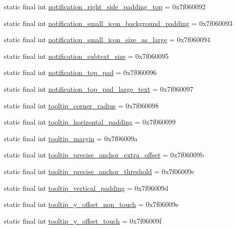 \begin{DoxyCompactItemize}
static final int \mbox{\hyperlink{classcom_1_1synnapps_1_1carouselview_1_1_r_1_1dimen_ad4e5934ef11224cd220e506921fb4fc2}{notification\+\_\+right\+\_\+side\+\_\+padding\+\_\+top}} = 0x7f060092
\item 
static final int \mbox{\hyperlink{classcom_1_1synnapps_1_1carouselview_1_1_r_1_1dimen_a8632048b827e9d3fb9257d745fc3974b}{notification\+\_\+small\+\_\+icon\+\_\+background\+\_\+padding}} = 0x7f060093
\item 
static final int \mbox{\hyperlink{classcom_1_1synnapps_1_1carouselview_1_1_r_1_1dimen_a2e67eae952d9f4b39406bed555451d94}{notification\+\_\+small\+\_\+icon\+\_\+size\+\_\+as\+\_\+large}} = 0x7f060094
\item 
static final int \mbox{\hyperlink{classcom_1_1synnapps_1_1carouselview_1_1_r_1_1dimen_a287e577ede3f2c380edc4d4b229c74f1}{notification\+\_\+subtext\+\_\+size}} = 0x7f060095
\item 
static final int \mbox{\hyperlink{classcom_1_1synnapps_1_1carouselview_1_1_r_1_1dimen_aec2a901140eddb446a6317c4f605ccec}{notification\+\_\+top\+\_\+pad}} = 0x7f060096
\item 
static final int \mbox{\hyperlink{classcom_1_1synnapps_1_1carouselview_1_1_r_1_1dimen_a1d087aa59785fee59003d5e2a9543f2a}{notification\+\_\+top\+\_\+pad\+\_\+large\+\_\+text}} = 0x7f060097
\item 
static final int \mbox{\hyperlink{classcom_1_1synnapps_1_1carouselview_1_1_r_1_1dimen_a411301c1011dea761c0ea5f831ecb09e}{tooltip\+\_\+corner\+\_\+radius}} = 0x7f060098
\item 
static final int \mbox{\hyperlink{classcom_1_1synnapps_1_1carouselview_1_1_r_1_1dimen_a42f1a58d5cb26c69309e9ab403347295}{tooltip\+\_\+horizontal\+\_\+padding}} = 0x7f060099
\item 
static final int \mbox{\hyperlink{classcom_1_1synnapps_1_1carouselview_1_1_r_1_1dimen_a8e39f4e16c1a9f73b236eb6be5cc4dfb}{tooltip\+\_\+margin}} = 0x7f06009a
\item 
static final int \mbox{\hyperlink{classcom_1_1synnapps_1_1carouselview_1_1_r_1_1dimen_a8548003c1cce40807fb06236c57d2cf6}{tooltip\+\_\+precise\+\_\+anchor\+\_\+extra\+\_\+offset}} = 0x7f06009b
\item 
static final int \mbox{\hyperlink{classcom_1_1synnapps_1_1carouselview_1_1_r_1_1dimen_a51b28aa236f92886449d27ae3bbe1e60}{tooltip\+\_\+precise\+\_\+anchor\+\_\+threshold}} = 0x7f06009c
\item 
static final int \mbox{\hyperlink{classcom_1_1synnapps_1_1carouselview_1_1_r_1_1dimen_a02f65094fd52ed30ae571ad98743d223}{tooltip\+\_\+vertical\+\_\+padding}} = 0x7f06009d
\item 
static final int \mbox{\hyperlink{classcom_1_1synnapps_1_1carouselview_1_1_r_1_1dimen_a58ff33fa5fc7a378ea08587f7ddc8915}{tooltip\+\_\+y\+\_\+offset\+\_\+non\+\_\+touch}} = 0x7f06009e
\item 
static final int \mbox{\hyperlink{classcom_1_1synnapps_1_1carouselview_1_1_r_1_1dimen_a306c12dc324e70dad041a6355795fa4d}{tooltip\+\_\+y\+\_\+offset\+\_\+touch}} = 0x7f06009f
\end{DoxyCompactItemize}
